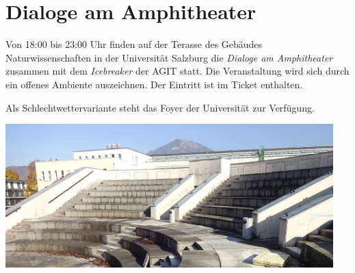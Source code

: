 \newpage
\thispagestyle{empty}
\section*{Dialoge am Amphitheater}
\label{social-event}
Von 18:00 bis 23:00 Uhr finden auf der Terasse des Gebäudes Naturwissenschaften in der Universität Salzburg
die \emph{Dialoge am Amphitheater} zusammen mit dem \emph{Icebreaker} der AGIT statt.
Die Veranstaltung wird sich durch ein offenes Ambiente auszeichnen. Der Eintritt ist im Ticket enthalten.

Als Schlechtwettervariante steht das Foyer der Universität zur Verfügung.

\noindent
\begin{center}
  \includegraphics[width=0.95\textwidth]{images-print/amphitheater-rechts-crop.jpg}
\end{center}

\justifying

